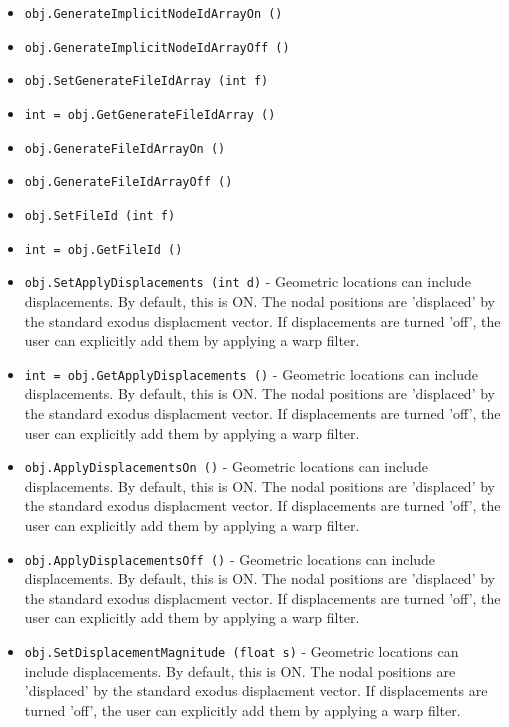 \begin{itemize}
\item  \verb|obj.GenerateImplicitNodeIdArrayOn ()|

\item  \verb|obj.GenerateImplicitNodeIdArrayOff ()|

\item  \verb|obj.SetGenerateFileIdArray (int f)|

\item  \verb|int = obj.GetGenerateFileIdArray ()|

\item  \verb|obj.GenerateFileIdArrayOn ()|

\item  \verb|obj.GenerateFileIdArrayOff ()|

\item  \verb|obj.SetFileId (int f)|

\item  \verb|int = obj.GetFileId ()|

\item  \verb|obj.SetApplyDisplacements (int d)| -  Geometric locations can include displacements.  By default, 
 this is ON.  The nodal positions are 'displaced' by the
 standard exodus displacment vector. If displacements
 are turned 'off', the user can explicitly add them by
 applying a warp filter.

\item  \verb|int = obj.GetApplyDisplacements ()| -  Geometric locations can include displacements.  By default, 
 this is ON.  The nodal positions are 'displaced' by the
 standard exodus displacment vector. If displacements
 are turned 'off', the user can explicitly add them by
 applying a warp filter.

\item  \verb|obj.ApplyDisplacementsOn ()| -  Geometric locations can include displacements.  By default, 
 this is ON.  The nodal positions are 'displaced' by the
 standard exodus displacment vector. If displacements
 are turned 'off', the user can explicitly add them by
 applying a warp filter.

\item  \verb|obj.ApplyDisplacementsOff ()| -  Geometric locations can include displacements.  By default, 
 this is ON.  The nodal positions are 'displaced' by the
 standard exodus displacment vector. If displacements
 are turned 'off', the user can explicitly add them by
 applying a warp filter.

\item  \verb|obj.SetDisplacementMagnitude (float s)| -  Geometric locations can include displacements.  By default, 
 this is ON.  The nodal positions are 'displaced' by the
 standard exodus displacment vector. If displacements
 are turned 'off', the user can explicitly add them by
 applying a warp filter.


\end{itemize}
